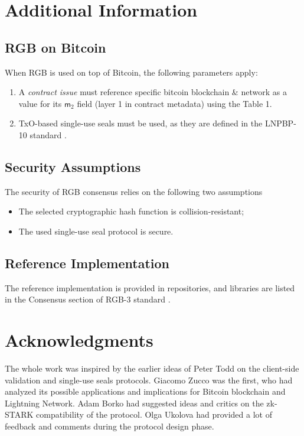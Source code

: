 \documentclass[a4paper]{article}
\begin{document}
\begin{multicols}{2}
\section{Additional Information}
\subsection{RGB on Bitcoin}

When RGB is used on top of Bitcoin, the following parameters apply:

\begin{enumerate}
\item A \emph{contract issue} must reference specific bitcoin blockchain \& network as a value for its
   $\mathsf{m}_2$ field (layer 1 in contract metadata) using the Table 1.
\item TxO-based single-use seals must be used, as they are defined in the LNPBP-10 standard \cite{LNPBP10}.
\end{enumerate}

\subsection{Security Assumptions}

The security of RGB consensus relies on the following two assumptions

\begin{itemize}
\item The selected cryptographic hash function is collision-resistant;
\item The used single-use seal protocol is secure.
\end{itemize}

\subsection{Reference Implementation}

The reference implementation is provided in repositories, and libraries are listed
in the Consensus section of RGB-3 standard \cite{RGB3}.

\section{Acknowledgments}
The whole work was inspired by the earlier ideas of Peter Todd on the client-side validation \cite{CSV}
and single-use seals \cite{SUS} protocols. Giacomo Zucco was the first, who had analyzed its possible
applications and implications for Bitcoin blockchain and Lightning Network.
Adam Borko had suggested ideas and critics on the zk-STARK compatibility of the protocol.
Olga Ukolova had provided a lot of feedback and comments during the protocol design phase.



\end{multicols}
\end{document}
